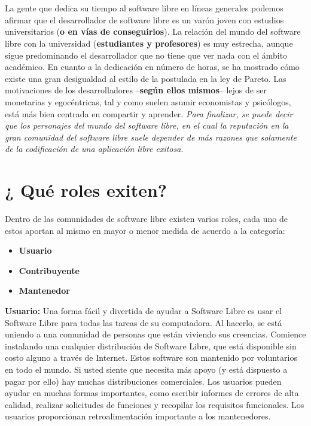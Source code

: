 \\
\\
La gente que dedica su tiempo al software libre en líneas generales podemos afirmar que el desarrollador de software libre es un varón joven con estudios universitarios ({\bf o en vías de conseguirlos}). La relación del mundo del software libre con la universidad ({\bf estudiantes y profesores}) es muy estrecha, aunque sigue predominando el desarrollador que no tiene que ver nada con el ámbito académico. En cuanto a la dedicación en número de horas, se ha mostrado cómo existe una gran desigualdad al estilo de la postulada en la ley de Pareto. 
Las motivaciones de los desarrolladores –{\bf según ellos mismos}– lejos de ser monetarias y egocéntricas, tal y como suelen asumir economistas y psicólogos, está más bien centrada en compartir y aprender. \emph{Para finalizar, se puede decir que los personajes del mundo del software libre, en el cual la reputación en la gran comunidad del software libre suele depender de más razones que solamente de la codificación de una aplicación libre exitosa}.

\section{¿ Qué roles exiten?}

Dentro de las comunidades de software libre existen varios roles, cada uno de estos aportan al mismo en mayor o menor medida de acuerdo a la categoría:
\begin{itemize}
     \item \textbf{Usuario}
     \item \textbf{Contribuyente}
     \item \textbf{Mantenedor}
\end{itemize}

\textbf{Usuario:} Una forma fácil y divertida de ayudar a Software Libre es usar el Software Libre para todas las tareas de su computadora. Al hacerlo, se está uniendo a una comunidad de personas que están viviendo sus creencias. Comience instalando una cualquier distribución de Software Libre, que está disponible sin costo alguno a través de Internet. Estos software son mantenido por voluntarios en todo el mundo. Si usted siente que necesita más apoyo (y está dispuesto a pagar por ello) hay muchas distribuciones comerciales. Los usuarios pueden ayudar en muchas formas importantes, como escribir informes de errores de alta calidad, realizar solicitudes de funciones y recopilar los requisitos funcionales. Los usuarios proporcionan retroalimentación importante a los mantenedores.


